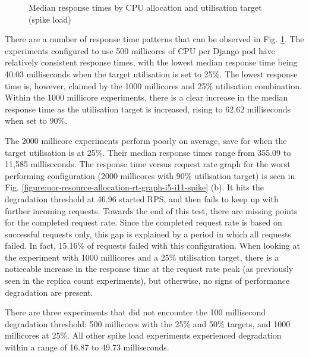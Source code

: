 \begin{figure}[H]
    \caption{Median response times by CPU allocation and utilisation target (spike load)}
    \label{figure:uor-resource-allocation-rt-comp-spike}
\end{figure}

There are a number of response time patterns that can be observed in Fig. \ref{figure:uor-resource-allocation-rt-comp-spike}. The experiments configured to use 500 millicores of CPU per Django pod have relatively consistent response times, with the lowest median response time being 40.03 milliseconds when the target utilisation is set to 25\%. The lowest response time is, however, claimed by the 1000 millicores and 25\% utilisation combination. Within the 1000 millicore experiments, there is a clear increase in the median response time as the utilisation target is increased, rising to 62.62 milliseconds when set to 90\%.

The 2000 millicore experiments perform poorly on average, save for when the target utilisation is at 25\%. Their median response times range from 355.09 to 11,585 milliseconds. The response time versus request rate graph for the worst performing configuration (2000 millicores with 90\% utilisation target) is seen in Fig. \ref{figure:uor-resource-allocation-rt-graph-i5-i11-spike} (b). It hits the degradation threshold at 46.96 started RPS, and then fails to keep up with further incoming requests. Towards the end of this test, there are missing points for the completed request rate. Since the completed request rate is based on successful requests only, this gap is explained by a period in which all requests failed. In fact, 15.16\% of requests failed with this configuration. When looking at the experiment with 1000 millicores and a 25\% utilisation target, there is a noticeable increase in the response time at the request rate peak (as previously seen in the replica count experiments), but otherwise, no signs of performance degradation are present.

There are three experiments that did not encounter the 100 millisecond degradation threshold: 500 millicores with the 25\% and 50\% targets, and 1000 millicores at 25\%. All other spike load experiments experienced degradation within a range of 16.87 to 49.73 milliseconds.

